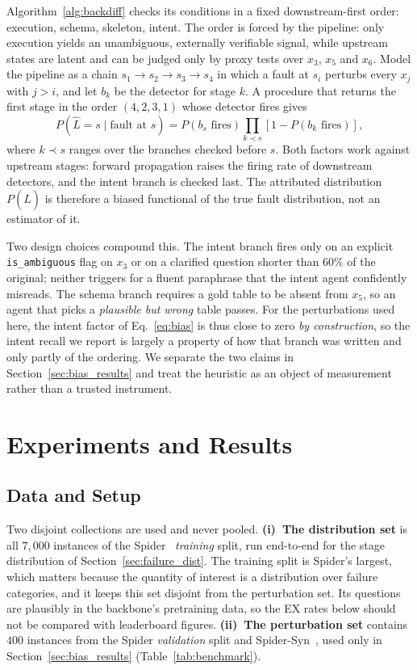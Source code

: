 \documentclass{llncs}
\begin{document}
Algorithm~\ref{alg:backdiff} checks its conditions in a fixed downstream-first
order: execution, schema, skeleton, intent. The order is forced by the
pipeline: only execution yields an unambiguous, externally verifiable signal,
while upstream states are latent and can be judged only by proxy tests over
$x_3$, $x_5$ and $x_6$. Model the pipeline as a chain
$s_1\to s_2\to s_3\to s_4$ in which a fault at $s_i$ perturbs every $x_j$ with
$j>i$, and let $b_k$ be the detector for stage $k$. A procedure that returns
the first stage in the order $(4,2,3,1)$ whose detector fires gives
\begin{equation}
P(\hat{L}=s \mid \text{fault at } s) = P(b_s \text{ fires})\prod_{k \prec s}\left[1 - P(b_k \text{ fires})\right],
\label{eq:bias}
\end{equation}
where $k\prec s$ ranges over the branches checked before $s$. Both factors work
against upstream stages: forward propagation raises the firing rate of
downstream detectors, and the intent branch is checked last. The attributed
distribution $P(\hat{L})$ is therefore a biased functional of the true fault
distribution, not an estimator of it.

Two design choices compound this. The intent branch fires only on an explicit
\texttt{is\_ambiguous} flag on $x_3$ or on a clarified question shorter than
$60\%$ of the original; neither triggers for a fluent paraphrase that the
intent agent confidently misreads. The schema branch requires a gold table to
be absent from $x_5$, so an agent that picks a \emph{plausible but wrong} table
passes. For the perturbations used here, the intent factor of
Eq.~\eqref{eq:bias} is thus close to zero \emph{by construction}, so the
intent recall we report is largely a property of how that branch was written
and only partly of the ordering. We separate the two claims in
Section~\ref{sec:bias_results} and treat the heuristic as an object of
measurement rather than a trusted instrument.

\section{Experiments and Results}
\label{sec:experiments}

\subsection{Data and Setup}
\label{sec:benchmark}

Two disjoint collections are used and never pooled. \textbf{(i)~The
distribution set} is all $7{,}000$ instances of the Spider~\cite{yu_spider_2018}
\emph{training} split, run end-to-end for the stage distribution of
Section~\ref{sec:failure_dist}. The training split is Spider's largest, which
matters because the quantity of interest is a distribution over failure
categories, and it keeps this set disjoint from the perturbation set. Its
questions are plausibly in the backbone's pretraining data, so the EX rates
below should not be compared with leaderboard figures. \textbf{(ii)~The
perturbation set} contains $400$ instances from the Spider \emph{validation}
split and Spider-Syn~\cite{gan_spider_syn_2021}, used only in
Section~\ref{sec:bias_results} (Table~\ref{tab:benchmark}).
\end{document}
